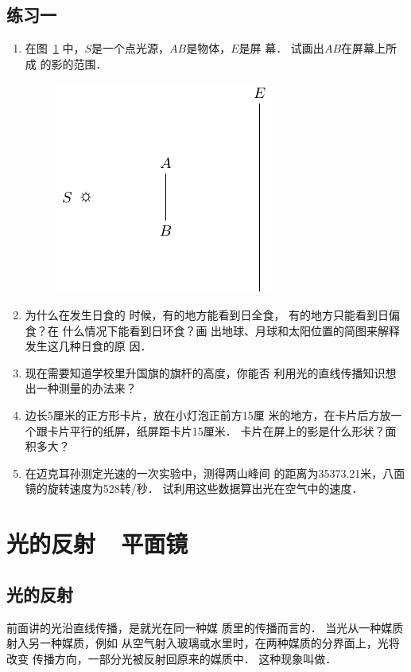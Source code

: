 \subsection*{练习一}
\begin{enumerate}
    \item 在图~\ref{fig_C_5-6} 中，$S$是一个点光源，$AB$是物体，$E$是屏
幕．
试画出$AB$在屏幕上所成
的影的范围．
\begin{figure}[htbp]
    \centering
    \includegraphics{fig/C/5-6.pdf}
    \caption{}\label{fig_C_5-6}
\end{figure}


\item 为什么在发生日食的
时候，有的地方能看到日全食，
有的地方只能看到日偏食？在
什么情况下能看到日环食？画
出地球、月球和太阳位置的简图来解释发生这几种日食的原
因．
\item 现在需要知道学校里升国旗的旗杆的高度，你能否
利用光的直线传播知识想出一种测量的办法来？
\item 边长5厘米的正方形卡片，放在小灯泡正前方15厘
米的地方，在卡片后方放一个跟卡片平行的纸屏，纸屏距卡片15厘米．
卡片在屏上的影是什么形状？面积多大？
\item 在迈克耳孙测定光速的一次实验中，测得两山峰间
的距离为35373.21米，八面镜的旋转速度为528转/秒．
试利用这些数据算出光在空气中的速度．
\end{enumerate}

\section{光的反射~~平面镜}
\subsection{光的反射}
前面讲的光沿直线传播，是就光在同一种媒
质里的传播而言的．
当光从一种媒质射入另一种媒质，例如
从空气射入玻璃或水里时，在两种媒质的分界面上，光将改变
传播方向，一部分光被反射回原来的媒质中．
这种现象叫做．

